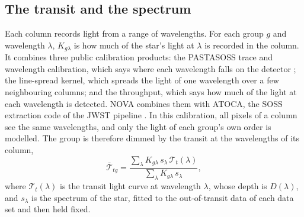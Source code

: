 \subsection{The transit and the spectrum}
\label{sec:transit}

Each column records light from a range of wavelengths. For each group $g$ and
wavelength $\lambda$, $K_{g\lambda}$ is how much of the star's light at
$\lambda$ is recorded in the column. It combines three public calibration
products: the PASTASOSS trace and wavelength calibration, which says where
each wavelength falls on the detector
\citep{BainesEtAl2023Trace,BainesEtAl2023Wavelength}; the line-spread kernel,
which spreads the light of one wavelength over a few neighbouring columns; and
the throughput, which says how much of the light at each wavelength is
detected. NOVA combines them with ATOCA, the SOSS extraction code of the JWST
pipeline \citep{DarveauBernierEtAl2022,JWSTPipeline2025}. In this
calibration, all pixels of a column see the same wavelengths, and only the
light of each group's own order is modelled. The group is therefore dimmed by the transit at the wavelengths
of its column,
\begin{equation}
 \bar{\mathcal{T}}_{tg}
 = \frac{\sum_{\lambda} K_{g\lambda}\, s_\lambda\, \mathcal{T}_t(\lambda)}
        {\sum_{\lambda} K_{g\lambda}\, s_\lambda},
 \label{eq:group-transit}
\end{equation}
where $\mathcal{T}_t(\lambda)$ is the transit light curve at wavelength
$\lambda$, whose depth is $D(\lambda)$, and $s_\lambda$ is the spectrum of the
star, fitted to the out-of-transit data of each data set and then held
fixed.

